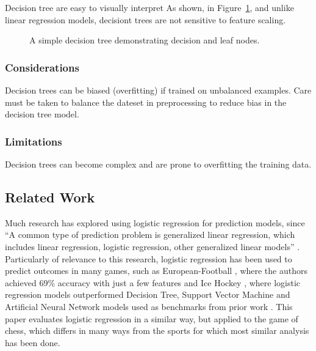 \documentclass[12pt]{article}
\begin{document}
Decision tree are easy to visually interpret As shown, in Figure~\ref{fig:decision-tree}, and unlike linear regression models, decisiont trees are not sensitive to feature scaling.

\begin{figure}[ht]
\centering
{}
\caption{A simple decision tree demonstrating decision and leaf nodes.}
\label{fig:decision-tree}
\end{figure}

\subsubsection{Considerations}Decision trees can be biased (overfitting) if trained on unbalanced examples. Care must be taken to balance the dateset in preprocessing to reduce bias in the decision tree model.

\subsubsection{Limitations}Decision trees can become complex and are prone to overfitting the training data.

\subsection{Related Work}

Much research has explored using logistic regression for prediction models, since ``A common type of prediction problem is generalized linear regression, which includes linear regression, logistic regression, other generalized linear
models'' \cite{Gordon1999}. Particularly of relevance to this research, logistic regression has been used to predict outcomes in many games, such as European-Football \cite{Prasetio2016}, where the authors achieved 69\% accuracy with just a few features and Ice Hockey \cite{Chin2023}, where logistic regression models outperformed Decision Tree, Support Vector Machine and Artificial Neural Network models used as benchmarks from prior work \cite{Pischedda2014} \cite{Igiri2014}. This paper evaluates logistic regression in a similar way, but applied to the game of chess, which differs in many ways from the sports for which most similar analysis has been done.
\end{document}
